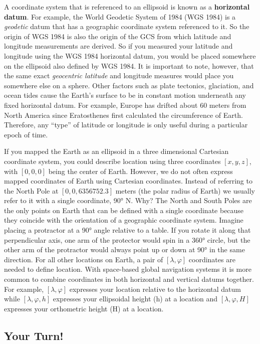 \documentclass[
]{book}
\begin{document}
A coordinate system that is referenced to an ellipsoid is known as a \textbf{horizontal datum}. For example, the World Geodetic System of 1984 (WGS 1984) is a \emph{geodetic} datum that has a geographic coordinate system referenced to it. So the origin of WGS 1984 is also the origin of the GCS from which latitude and longitude measurements are derived. So if you measured your latitude and longitude using the WGS 1984 horizontal datum, you would be placed somewhere on the ellipsoid also defined by WGS 1984. It is important to note, however, that the same exact \emph{geocentric latitude} and longitude measures would place you somewhere else on a sphere. Other factors such as plate tectonics, glaciation, and ocean tides cause the Earth's surface to be in constant motion underneath any fixed horizontal datum. For example, Europe has drifted about 60 meters from North America since Eratosthenes first calculated the circumference of Earth. Therefore, any ``type'' of latitude or longitude is only useful during a particular epoch of time.

If you mapped the Earth as an ellipsoid in a three dimensional Cartesian coordinate system, you could describe location using three coordinates \([x,y,z]\), with \([0,0,0]\) being the center of Earth. However, we do not often express mapped coordinates of Earth using Cartesian coordinates. Instead of referring to the North Pole at \([0,0,6356752.3]\) meters (the polar radius of Earth) we usually refer to it with a single coordinate, 90° N. Why? The North and South Poles are the only points on Earth that can be defined with a single coordinate because they coincide with the orientation of a geographic coordinate system. Imagine placing a protractor at a 90° angle relative to a table. If you rotate it along that perpendicular axis, one arm of the protector would spin in a 360° circle, but the other arm of the protractor would always point up or down at 90° in the same direction. For all other locations on Earth, a pair of \([λ,φ]\) coordinates are needed to define location. With space-based global navigation systems it is more common to combine coordinates in both horizontal and vertical datums together. For example, \([λ,φ]\) expresses your location relative to the horizontal datum while \([λ,φ,h]\) expresses your ellipsoidal height (h) at a location and \([λ,φ,H]\) expresses your orthometric height (H) at a location.

\hypertarget{your-turn}{%
\subsection*{Your Turn!}\label{your-turn}}
\end{document}
